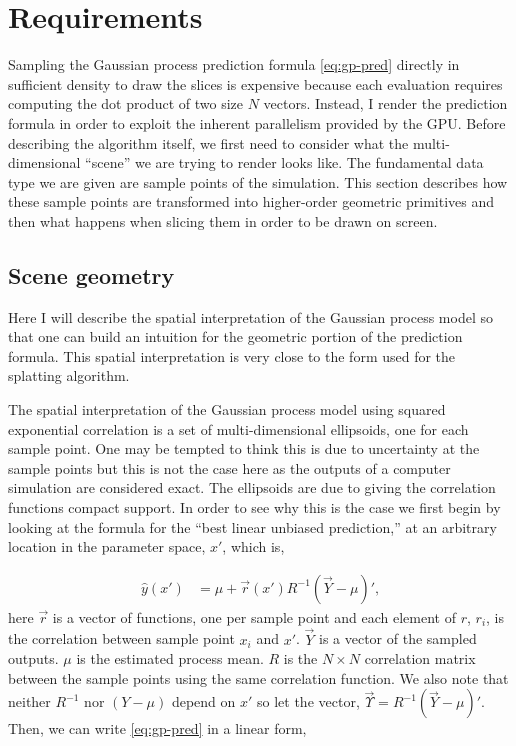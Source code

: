 \section{Requirements}
\label{sec:requirements}

Sampling the Gaussian process prediction formula \autoref{eq:gp-pred} directly
in sufficient density to draw the slices is expensive because each evaluation
requires computing the dot product of two size $N$ vectors.  Instead, I render
the prediction formula in order to exploit the inherent parallelism provided by
the GPU. Before describing the algorithm itself, we first need to consider what
the multi-dimensional ``scene'' we are trying to render looks like.  The
fundamental data type we are given are sample points of the simulation.  This
section describes how these sample points are transformed into higher-order
geometric primitives and then what happens when slicing them in order to be
drawn on screen.

\subsection{Scene geometry}
\label{sec:scene_geometry}

Here I will describe the spatial interpretation of the Gaussian process
model so that one can build an intuition for the geometric portion of the 
prediction formula.  This spatial interpretation is very close to the 
form used for the splatting algorithm.

The spatial interpretation of the Gaussian process model using squared 
exponential correlation is a set of 
multi-dimensional ellipsoids, one for each sample point. 
One may be tempted to think this is due to uncertainty at the sample points
but this is not the case here as the outputs of a computer simulation are
considered exact. The ellipsoids are due to giving the correlation functions
compact support.
In order to see
why this is the case we first begin by looking at the formula for the 
``best linear unbiased prediction,''
at an arbitrary location
in the parameter space, $x'$, which is,

\begin{align}
  \hat{y}(x') &= \mu + \vec{r}(x') R^{-1} (\vec{Y} - \mu)' \text{,}
  \label{eq:gp-pred}
\end{align}
here $\vec{r}$ is a vector of functions, one per sample point
and each element of $r$, $r_i$, is the correlation 
between
sample point $x_i$ and $x'$.  
$\vec{Y}$ is a vector of the sampled outputs.
$\mu$ is the estimated process mean.
$R$ is 
the $N \times N$ correlation matrix 
between the sample points using the same correlation function.
We also note that neither $R^{-1}$ nor $(Y - \mu)$
depend on $x'$ so let the vector, 
$\vec{\Upsilon} = R^{-1} (\vec{Y} - \mu)'$.  
Then, we can write \autoref{eq:gp-pred} in a linear form,

